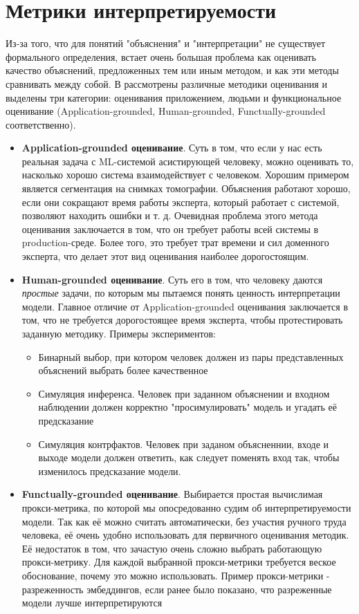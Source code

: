 \chapter{Метрики интерпретируемости}

Из-за того, что для понятий "объяснения" и "интерпретации" не существует формального определения, встает очень большая проблема как оценивать качество объяснений, предложенных тем или иным методом, и как эти методы сравнивать между собой. В  рассмотрены различные методики оценивания и выделены три категории: оценивания приложением, людьми и функциональное оценивание (Application-grounded, Human-grounded, Functually-grounded соответственно).

\begin{itemize}
    \item \textbf{Application-grounded оценивание}. Суть в том, что если у нас есть реальная задача с ML-системой асистирующей человеку, можно оценивать то, насколько хорошо система взаимодействует с человеком. Хорошим примером является сегментация на снимках томографии. Объяснения работают хорошо, если они сокращают время работы эксперта, который работает с системой, позволяют находить ошибки и т. д.
    Очевидная проблема этого метода оценивания заключается в том, что он требует работы всей системы в production-среде. Более того, это требует трат времени и сил доменного эксперта, что делает этот вид оценивания наиболее дорогостоящим. 
    \item \textbf{Human-grounded оценивание}. Суть его в том, что человеку даются \textit{простые} задачи, по которым мы пытаемся понять ценность интерпретации модели. Главное отличие от Application-grounded оценивания заключается в том, что не требуется дорогостоящее время эксперта, чтобы протестировать заданную методику. Примеры экспериментов:
    \begin{itemize}
        \item Бинарный выбор, при котором человек должен из пары представленных объяснений выбрать более качественное
        \item Симуляция инференса. Человек при заданном объяснении и входном наблюдении должен корректно "просимулировать" модель и угадать её предсказание
        \item Симуляция контрфактов. Человек при заданом объясненнии, входе и выходе модели должен ответить, как следует поменять вход так, чтобы изменилось предсказание модели.
    \end{itemize}
    \item \textbf{Functually-grounded оценивание}. Выбирается простая вычислимая прокси-метрика, по которой мы опосредованно судим об интерпретируемости модели. Так как её можно считать автоматически, без участия ручного труда человека, её очень удобно использовать для первичного оценивания методик. Её недостаток в том, что зачастую очень сложно выбрать работающую прокси-метрику. Для каждой выбранной прокси-метрики требуется веское обоснование, почему это можно использовать.
    Пример прокси-метрики - разреженность эмбеддингов, если ранее было показано, что разреженные модели лучше интерпретируются
\end{itemize}

